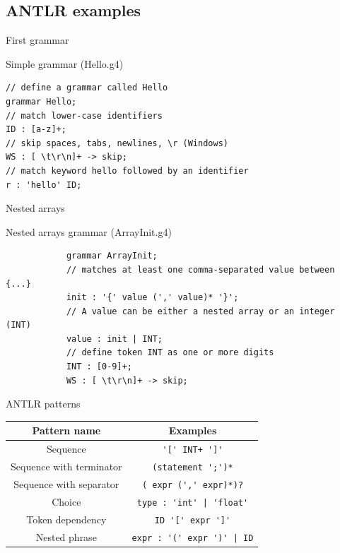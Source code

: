 \documentclass{beamer}
\begin{document}
	

\subsection{ANTLR examples}

\begin{frame}[fragile]{First grammar}
	\begin{exampleblock}{Simple grammar (Hello.g4)}
		\begin{verbatim}
// define a grammar called Hello
grammar Hello;
// match lower-case identifiers
ID : [a-z]+;
// skip spaces, tabs, newlines, \r (Windows)
WS : [ \t\r\n]+ -> skip;
// match keyword hello followed by an identifier
r : 'hello' ID;
		\end{verbatim}
	\end{exampleblock}
\end{frame}

\begin{frame}[fragile]{Nested arrays}
	
	\begin{exampleblock}{Nested arrays grammar (ArrayInit.g4)}
		\begin{verbatim}
			grammar ArrayInit;
			// matches at least one comma-separated value between {...}
			init : '{' value (',' value)* '}';
			// A value can be either a nested array or an integer (INT)
			value : init | INT;
			// define token INT as one or more digits
			INT : [0-9]+;
			WS : [ \t\r\n]+ -> skip;
		\end{verbatim}
	\end{exampleblock}
\end{frame}


\begin{frame}[fragile]{ANTLR patterns}
	\begin{table}[H]
		\begin{tabular}{c|c}
			\textbf{Pattern name} & \textbf{Examples} \\
			\hline
			Sequence & \verb|'[' INT+ ']'|\\
			Sequence with terminator & \verb|(statement ';')*| \\
			Sequence with separator & \verb|( expr (',' expr)*)?| \\
			Choice & \verb^type : 'int' | 'float'^\\
			Token dependency & \verb|ID '[' expr ']'| \\
			Nested phrase & \verb^expr : '(' expr ')' | ID^
		\end{tabular}
	\end{table}
\end{frame}
\end{document}
